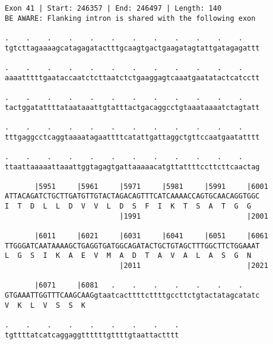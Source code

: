 \documentclass{article}
\begin{document}
\newpage
\begin{Verbatim}
Exon 41 | Start: 246357 | End: 246497 | Length: 140
BE AWARE: Flanking intron is shared with the following exon
 
.    .    .    .    .    .    .    .    .    .    .    .    
tgtcttagaaaagcatagagatactttgcaagtgactgaagatagtattgatagagattt
  
.    .    .    .    .    .    .    .    .    .    .    .    
aaaatttttgaataccaatctcttaatctctgaaggagtcaaatgaatatactcatcctt
  
.    .    .    .    .    .    .    .    .    .    .    .    
tactggatattttataataaattgtatttactgacaggcctgtaaataaaatctagtatt
  
.    .    .    .    .    .    .    .    .    .    .    .    
tttgaggcctcaggtaaaatagaattttcatattgattaggctgttccaatgaatatttt
  
.    .    .    .    .    .    .    .    .    .    .    .    
ttaattaaaaattaaattggtagagtgattaaaaacatgttattttccttcttcaactag
  
       |5951     |5961     |5971     |5981     |5991     |6001
ATTACAGATCTGCTTGATGTTGTACTAGACAGTTTCATCAAAACCAGTGCAACAGGTGGC
I  T  D  L  L  D  V  V  L  D  S  F  I  K  T  S  A  T  G  G  
                           |1991                         |2001
  
       |6011     |6021     |6031     |6041     |6051     |6061
TTGGGATCAATAAAAGCTGAGGTGATGGCAGATACTGCTGTAGCTTTGGCTTCTGGAAAT
L  G  S  I  K  A  E  V  M  A  D  T  A  V  A  L  A  S  G  N  
                           |2011                         |2021
  
       |6071     |6081   .    .    .    .    .    .    .    
GTGAAATTGGTTTCAAGCAAGgtaatcacttttcttttgccttctgtactatagcatatc
V  K  L  V  S  S  K                                         
  
.    .    .    .    .    .    .    .    .
tgttttatcatcaggaggttttttgttttgtaattactttt
\end{Verbatim}
\newpage
\end{document}
